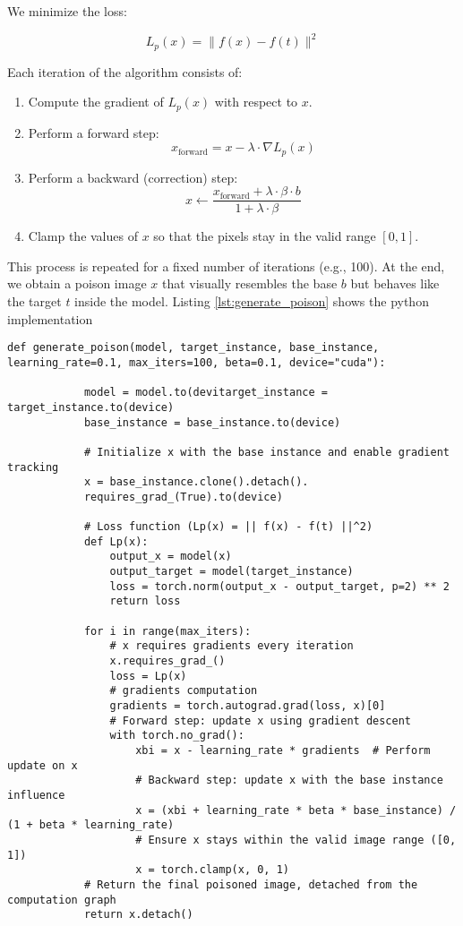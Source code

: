We minimize the loss:

\[
L_p(x) = \| f(x) - f(t) \|^2
\]

Each iteration of the algorithm consists of:
\begin{enumerate}
    \item Compute the gradient of $L_p(x)$ with respect to $x$.
    \item Perform a forward step:
    \[
    x_{\text{forward}} = x - \lambda \cdot \nabla L_p(x)
    \]
    \item Perform a backward (correction) step:
    \[
    x \leftarrow \frac{x_{\text{forward}} + \lambda \cdot \beta \cdot b}{1 + \lambda \cdot \beta}
    \]
    \item Clamp the values of $x$ so that the pixels stay in the valid range $[0, 1]$.
\end{enumerate}

This process is repeated for a fixed number of iterations (e.g., 100). At the end, we obtain a poison image $x$ that visually resembles the base $b$ but behaves like the target $t$ inside the model.
Listing \ref{lst:generate_poison} shows the python implementation
\begin{minipage}{\linewidth}
    \begin{lstlisting}[caption=Generate Poison algorithm, label={lst:generate_poison}]
        def generate_poison(model, target_instance, base_instance, learning_rate=0.1, max_iters=100, beta=0.1, device="cuda"):
    
            model = model.to(devitarget_instance = target_instance.to(device)
            base_instance = base_instance.to(device)

            # Initialize x with the base instance and enable gradient tracking
            x = base_instance.clone().detach().
            requires_grad_(True).to(device)

            # Loss function (Lp(x) = || f(x) - f(t) ||^2)
            def Lp(x):
                output_x = model(x)
                output_target = model(target_instance)
                loss = torch.norm(output_x - output_target, p=2) ** 2
                return loss

            for i in range(max_iters):
                # x requires gradients every iteration
                x.requires_grad_()  
                loss = Lp(x)
                # gradients computation
                gradients = torch.autograd.grad(loss, x)[0]
                # Forward step: update x using gradient descent
                with torch.no_grad():
                    xbi = x - learning_rate * gradients  # Perform update on x
                    # Backward step: update x with the base instance influence
                    x = (xbi + learning_rate * beta * base_instance) / (1 + beta * learning_rate)
                    # Ensure x stays within the valid image range ([0, 1])
                    x = torch.clamp(x, 0, 1)
            # Return the final poisoned image, detached from the computation graph
            return x.detach()
    \end{lstlisting}
\end{minipage}
